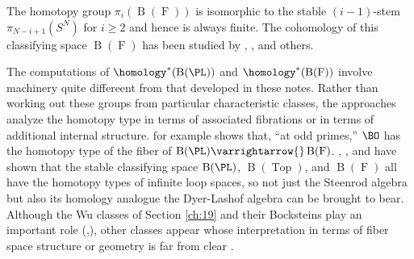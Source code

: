\documentclass[../main]{subfiles}
\begin{document}
The homotopy group $\pi_i(\operatorname{B}(\operatorname{F}))$ is isomorphic to the stable $(i-1)$-stem $\pi_{N-i+1}(S^N)$ for $i \geq 2$ and hence is always finite. The cohomology of this classifying space $\operatorname{B}(\operatorname{F})$ has been studied by \cite{milgram}, \cite{may2006geometry}, and others.

The computations of $\homology^\ast(\operatorname{B}(\PL))$ and $\homology^\ast(\operatorname{B}(\operatorname{F}))$ involve machinery quite differeent from that developed in these notes. Rather than working out these groups from particular characteristic classes, the approaches analyze the homotopy type in terms of associated fibrations or in terms of additional internal structure. \cite{sullivan_2006} for example shows that, ``at odd primes,'' $\BO$ has the homotopy type of the fiber of $\operatorname{B}(\PL) \varrightarrow{} \operatorname{B}(\operatorname{F})$. \cite{boardman1973}, \cite{may2006geometry}, and \cite{SEGAL1974293} have shown that the stable classifying space $\operatorname{B}(\PL)$, $\operatorname{B}(\operatorname{Top})$, and $\operatorname{B}(\operatorname{F})$ all have the homotopy types of infinite loop spaces, so not just the Steenrod algebra but also its homology analogue the Dyer-Lashof algebra can be brought to bear. Although the Wu classes of Section \ref{ch:19} and their Bocksteins play an important role (\cite{milnor1968},\cite{stasheff1968}), other classes appear whose interpretation in terms of fiber space structure or geometry is far from clear \cite{Ravenel1972}.
\end{document}
